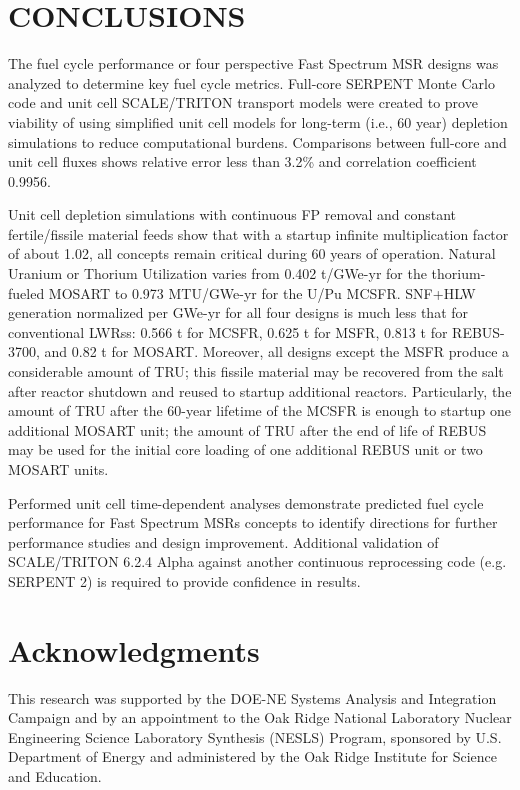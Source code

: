 \documentclass{anstrans}
\begin{document}
\section{CONCLUSIONS}
The fuel cycle performance or four perspective Fast Spectrum \gls{MSR} designs was analyzed to determine key fuel cycle metrics. Full-core SERPENT Monte Carlo code and unit cell SCALE/TRITON transport models were created to prove viability of using simplified unit cell models for long-term (i.e., 60 year) depletion simulations to reduce computational burdens. Comparisons between full-core and unit cell fluxes shows relative error less than 3.2\% and correlation coefficient 0.9956.

Unit cell depletion simulations with continuous \gls{FP} removal and constant fertile/fissile material feeds show that with a startup infinite multiplication factor of about 1.02, all concepts remain critical during 60 years of operation. Natural Uranium or Thorium Utilization varies from 0.402 t/GWe-yr for the thorium-fueled \gls{MOSART} to 0.973 MTU/GWe-yr for the U/Pu \gls{MCSFR}. \gls{SNF}+\gls{HLW} generation normalized per GWe-yr for all four designs is much less that for conventional \glspl{LWR}s: 0.566 t for \gls{MCSFR}, 0.625 t for \gls{MSFR}, 0.813 t for REBUS-3700, and 0.82 t for \gls{MOSART}. Moreover, all designs except the \gls{MSFR} produce a considerable amount of \gls{TRU}; this fissile material may be recovered from the salt after reactor shutdown and reused to startup additional reactors. Particularly, the amount of \gls{TRU} after the 60-year lifetime of the \gls{MCSFR} is enough to startup one additional \gls{MOSART} unit; the amount of \gls{TRU} after the end of life of REBUS may be used for the initial core loading of one additional REBUS unit or two \gls{MOSART} units. 

Performed unit cell time-dependent analyses demonstrate predicted fuel cycle performance for Fast Spectrum \glspl{MSR} concepts to identify directions for further performance studies and design improvement. Additional validation of SCALE/TRITON 6.2.4 Alpha against another continuous reprocessing code (e.g. SERPENT 2) is required to provide confidence in results.

\section{Acknowledgments}
This research was supported by the DOE-NE Systems Analysis and Integration Campaign and by an appointment to the Oak Ridge National Laboratory Nuclear Engineering Science Laboratory Synthesis (NESLS) Program, sponsored by U.S. Department of Energy and administered by the Oak Ridge Institute for Science and Education.



\end{document}
